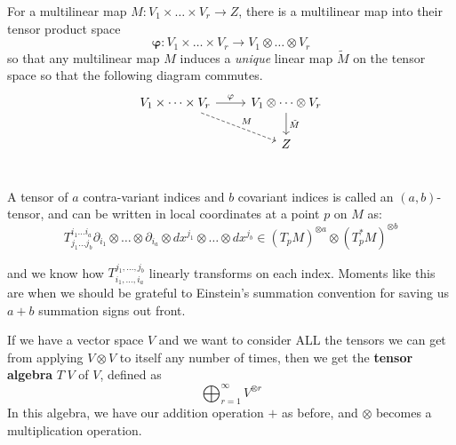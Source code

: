 	\begin{prop}
		For a multilinear map $M: V_1 \times \dots \times V_r \rightarrow Z$, there is a multilinear map into their tensor product space
		\begin{equation}
			\mathbf \varphi: V_1 \times \dots \times V_r \rightarrow V_1 \otimes \dots \otimes V_r
		\end{equation}
		so that any multilinear map $M$ induces a \emph{unique} linear map $\tilde M$ on the tensor space so that the following diagram commutes. 
		\[ 
		\begin{tikzcd}
		V_1 \times \dots \times V_r \arrow{r}{\varphi} \arrow[dashrightarrow]{rd}{M} & V_1 \otimes \dots \otimes V_r \arrow{d}{\tilde M} \\
		  & Z \\
		\end{tikzcd}
		\]
	\end{prop}
	
	
	
	\begin{defn}[An $(a,b)$-Tensor]
		A tensor of $a$ contra-variant indices and $b$ covariant indices is called an $(a,b)$-tensor, and can be written in local coordinates at a point $p$ on $M$ as:
		\begin{equation*}
			T_{j_1 \dots j_b}^{i_1 \dots i_a}  \partial_{i_1} \otimes \dots \otimes \partial_{i_a} \otimes dx^{j_1} \otimes \dots \otimes dx^{j_b}  \in (T_p M)^{\otimes a} \otimes (T_p^* M)^{\otimes b} 
		\end{equation*}
	\end{defn}
	and we know how $T_{i_1, \dots, i_a}^{j_1, \dots, j_b}$ linearly transforms on each index. Moments like this are when we should be grateful to Einstein's summation convention for saving us $a+b$ summation signs out front. 
	
	If we have a vector space $V$ and we want to consider ALL the tensors we can get from applying $V \otimes V$ to itself any number of times, then we get the \textbf{tensor algebra} $T^\cdot V$ of $V$, defined as
	\begin{equation}
		\bigoplus_{r=1}^\infty V^{\otimes r}
	\end{equation}
	In this algebra, we have our addition operation $+$ as before, and $\otimes$ becomes a multiplication operation.\\

